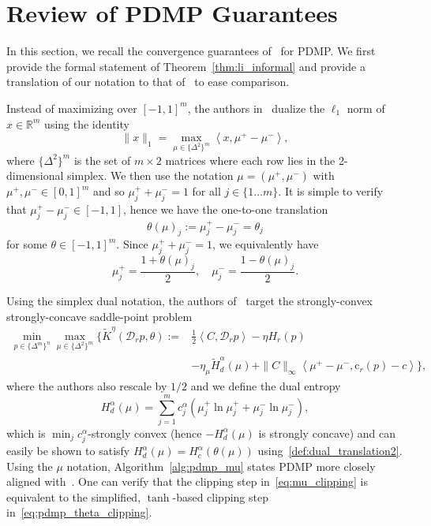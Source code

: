 \documentclass[10pt]{article}
\newcommand{\R}{\mathbb{R}}
\newcommand{\inner}[2]{\left\langle #1,#2\right\rangle}
\newcommand{\diag}[1]{\mathcal{D}_{#1}}
\theoremstyle{plain}
\theoremstyle{definition}
\theoremstyle{remark}
\newcommand{\col}{\bm{\mathrm{c}}}
\begin{document}
\section{Review of PDMP Guarantees}\label{appdx:sketch}
In this section, we recall the convergence guarantees of~\cite{liFastComputationOptimal2025} for PDMP. We first provide the formal statement of Theorem~\ref{thm:li_informal} and provide a translation of our notation to that of~\cite{liFastComputationOptimal2025} to ease comparison.

Instead of maximizing over $[-1,1]^m$, the authors in~\cite{liFastComputationOptimal2025} dualize the $\ell_1$ norm of $x\in\R^m$ using the identity
\begin{equation}
    \|x\|_1=\max_{\mu\in\{\Delta^{2}\}^m}\inner{x}{\mu^+-\mu^-},
\end{equation}
where $\{\Delta^{2}\}^m$ is the set of $m\times 2$ matrices where each row lies in the 2-dimensional simplex. We then use the notation $\mu=(\mu^+,\mu^-)$ with $\mu^+,\mu^-\in[0,1]^m$ and so $\mu^+_j+\mu^-_j=1$ for all $j\in\{1\dots m\}$. It is simple to verify that $\mu^+_j-\mu^-_j\in[-1,1]$, hence we have the one-to-one translation
\begin{equation}\label{def:dual_translation}
    \theta(\mu)_j:=\mu^+_j-\mu^-_j=\theta_j
\end{equation}
for some $\theta\in[-1,1]^m$. Since $\mu^+_j+\mu^-_j=1$, we equivalently have
\begin{equation}\label{def:dual_translation2}
    \mu^+_j=\frac{1+\theta(\mu)_j}{2},\quad \mu^-_j=\frac{1-\theta(\mu)_j}{2}.
\end{equation}

Using the simplex dual notation, the authors of~\cite{liFastComputationOptimal2025} target the strongly-convex strongly-concave saddle-point problem
\begin{align}\label{prob:spp_reg}
    \nonumber\min_{p\in\{\Delta^m\}^n}\max_{\mu\in\{\Delta^{2}\}^m}\biggl\{\widetilde{K}^{\eta}(\diag{r}p,\theta):=&\frac{1}{2}\inner{C}{\diag{r}p} - \eta  H_r(p) \\
    &-\eta_\mu \widetilde H^\alpha_d(\mu)+ \|C\|_\infty\inner{\mu^+-\mu^-}{\col_r(p) -c}\biggr\},
\end{align}
where the authors also rescale by $1/2$ and we define the dual entropy
\[
H^\alpha_d(\mu)=\sum_{j=1}^mc^\alpha_j(\mu^+_j\ln\mu^+_j+\mu^-_j\ln\mu^-_j),
\]
which is $\min_jc^\alpha_j$-strongly convex (hence $-H^\alpha_d(\mu)$ is strongly concave) and can easily be shown to satisfy $H^\alpha_d(\mu)=H_c^\alpha(\theta(\mu))$ using~\eqref{def:dual_translation2}. Using the $\mu$ notation, Algorithm~\ref{alg:pdmp_mu} states PDMP more closely aligned with~\cite{liFastComputationOptimal2025}.
One can verify that the clipping step in~\eqref{eq:mu_clipping} is equivalent to the simplified, $\tanh$-based clipping step in~\eqref{eq:pdmp_theta_clipping}. 
\end{document}
